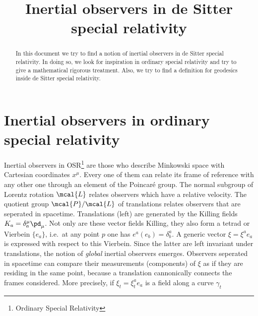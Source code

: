 \documentclass[10pt]{article}
\author{}
\title{Inertial observers in de Sitter special relativity}
\date{}
\numberwithin{equation}{section}
\begin{document}
\maketitle

\begin{abstract}
	In this document we try to find a notion of inertial observers 
	in de Sitter special relativity. In doing so, we look for 
	inspiration in ordinary special relativity and try to give a 
	mathematical rigorous treatment. Also, we try to find a 
	definition for geodesics inside de Sitter special relativity.
\end{abstract}

\section{Inertial observers in ordinary special relativity}

Inertial observers in OSR\footnote{Ordinary Special Relativity} 
are those who describe Minkowski space with Cartesian coordinates 
$x^\mu$. Every one of them can relate its frame of reference with 
any other one through an element of the Poincar\'e group. The 
normal subgroup of Lorentz rotation $\mcal{L}$ relates observers 
which have a relative velocity. The quotient group 
$\mcal{P}/\mcal{L}$ of translations relates observers that are 
seperated in spacetime. Translations (left) are generated by the 
Killing fields $K_a = \delta^\mu_a \pd_\mu$. Not only are these 
vector fields Killing, they also form a tetrad or Vierbein 
$\{e_a\}$, i.e.\ at any point $p$ one has $e^a (e_b) = 
\delta^a_b$. A generic vector $\xi = \xi^a e_a$ is expressed with 
respect to this Vierbein. Since the latter are left invariant 
under translations, the notion of \emph{global} inertial 
observers emerges. Observers seperated in spacetime can compare 
their measurements (components) of $\xi$ as if they are residing 
in the same point, because a translation cannonically connects 
the frames considered. More precisely, if $\xi_t = \xi^a_t e_a$ 
is a field along a curve $\gamma_t$
\end{document}
